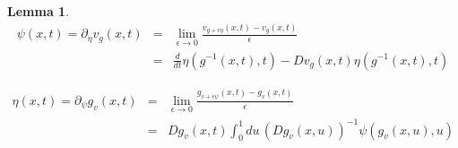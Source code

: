 \documentclass[final, paper=letter,5p,times,twocolumn]{elsarticle}
\theoremstyle{definition}
\newtheorem{lemma}[theorem]{Lemma}
\begin{document}
\begin{lemma}

\begin{eqnarray*}
\psi(x,t) = \partial_{\eta} v_{g}(x,t) & = & \underset{\epsilon \rightarrow 0}{\lim} \frac{v_{g+\epsilon \eta}(x,t) - v_{g}(x,t)}{\epsilon} \\
& = & \frac{d}{dt} \eta(g^{-1}(x,t),t) - D v_{g}(x,t) \eta (g^{-1}(x,t),t)
\end{eqnarray*}

\begin{eqnarray*}
\eta(x,t) = \partial_{\psi} g_{v}(x,t) & = & \underset{\epsilon \rightarrow 0}{\lim} \frac{g_{v + \epsilon \psi}(x,t) - g_{v}(x,t)}{\epsilon} \\
& = & Dg_{v}(x,t) \int_{0}^{1} du \, (Dg_{v}(x,u))^{-1} \psi (g_{v}(x,u),u)
\end{eqnarray*}
\end{lemma}
\end{document}
